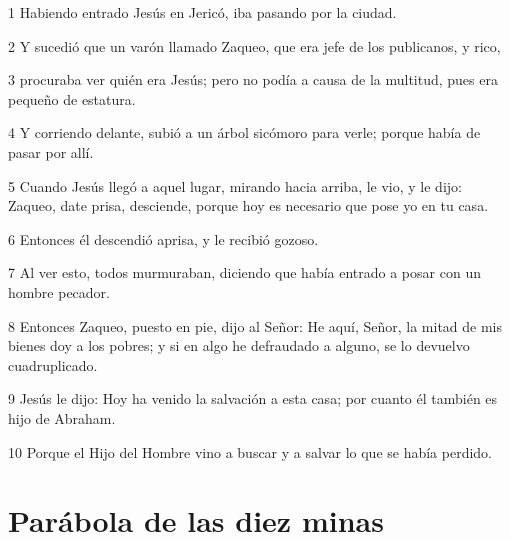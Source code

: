 \par 1 Habiendo entrado Jesús en Jericó, iba pasando por la ciudad.
\par 2 Y sucedió que un varón llamado Zaqueo, que era jefe de los publicanos, y rico,
\par 3 procuraba ver quién era Jesús; pero no podía a causa de la multitud, pues era pequeño de estatura.
\par 4 Y corriendo delante, subió a un árbol sicómoro para verle; porque había de pasar por allí.
\par 5 Cuando Jesús llegó a aquel lugar, mirando hacia arriba, le vio, y le dijo: Zaqueo, date prisa, desciende, porque hoy es necesario que pose yo en tu casa.
\par 6 Entonces él descendió aprisa, y le recibió gozoso.
\par 7 Al ver esto, todos murmuraban, diciendo que había entrado a posar con un hombre pecador.
\par 8 Entonces Zaqueo, puesto en pie, dijo al Señor: He aquí, Señor, la mitad de mis bienes doy a los pobres; y si en algo he defraudado a alguno, se lo devuelvo cuadruplicado.
\par 9 Jesús le dijo: Hoy ha venido la salvación a esta casa; por cuanto él también es hijo de Abraham.
\par 10 Porque el Hijo del Hombre vino a buscar y a salvar lo que se había perdido.

\section*{Parábola de las diez minas}

